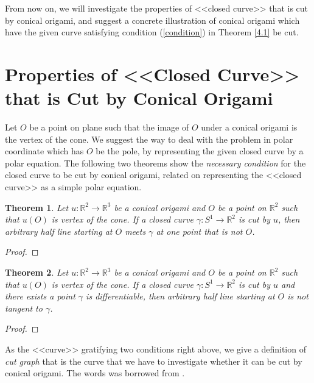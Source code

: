 \documentclass{amsart}
\theoremstyle{plain}
\newtheorem{theorem}{Theorem}[section]
\theoremstyle{definition}
\theoremstyle{remark}
\begin{document}
From now on, we will investigate the properties of <<closed curve>> that is cut by conical origami, and suggest a concrete illustration of conical origami which have the given curve satisfying condition (\ref{condition}) in Theorem \ref{4.1} be cut.







\section{Properties of <<Closed Curve>> that is Cut by Conical Origami}%

Let $O$ be a point on plane such that the image of $O$ under a conical origami is the vertex of the cone.
We suggest the way to deal with the problem in polar coordinate which has $O$ be the pole, by representing the given closed curve by a polar equation.
The following two theorems show the {\it necessary condition} for the closed curve to be cut by conical origami, related on representing the <<closed curve>> as a simple polar equation.


\begin{theorem}\label{3.1}%
Let $u:{\mathbb R}^2\to{\mathbb R}^3$ be a conical origami and $O$ be a point on ${\mathbb R}^2$ such that $u(O)$ is vertex of the cone.
If a closed curve $\gamma:S^1\to{\mathbb R}^2$ is cut by $u$, then arbitrary half line starting at $O$ meets $\gamma$ at one point that is not $O$.
\end{theorem}

\begin{proof}

\end{proof}


\begin{theorem}\label{3.2}%
Let $u:{\mathbb R}^2\to{\mathbb R}^3$ be a conical origami and $O$ be a point on ${\mathbb R}^2$ such that $u(O)$ is vertex of the cone.
If a closed curve $\gamma:S^1\to{\mathbb R}^2$ is cut by $u$ and there exists a point $\gamma$ is differentiable, then arbitrary half line starting at $O$ is not tangent to $\gamma$.
\end{theorem}

\begin{proof}

\end{proof}

As the <<curve>> gratifying two conditions right above, we give a definition of {\it cut graph} that is the curve that we have to investigate whether it can be cut by conical origami.
The words was borrowed from \cite{Fac}.
\end{document}
